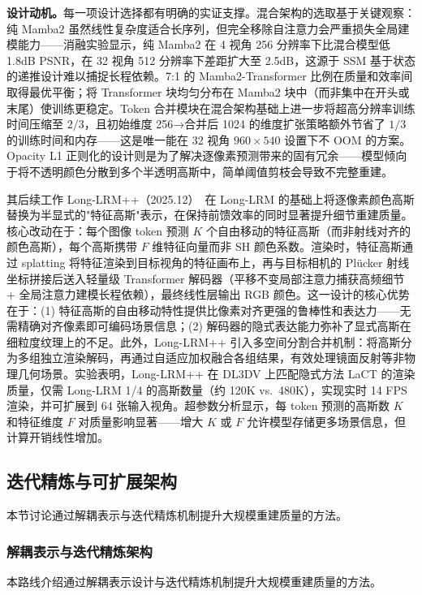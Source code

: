 \textbf{设计动机。}每一项设计选择都有明确的实证支撑。混合架构的选取基于关键观察：纯 Mamba2 虽然线性复杂度适合长序列，但完全移除自注意力会严重损失全局建模能力——消融实验显示，纯 Mamba2 在 4 视角 256 分辨率下比混合模型低 1.8dB PSNR，在 32 视角 512 分辨率下差距扩大至 2.5dB，这源于 SSM 基于状态的递推设计难以捕捉长程依赖。7:1 的 Mamba2-Transformer 比例在质量和效率间取得最优平衡；将 Transformer 块均匀分布在 Mamba2 块中（而非集中在开头或末尾）使训练更稳定。Token 合并模块在混合架构基础上进一步将超高分辨率训练时间压缩至 $2/3$，且初始维度 256→合并后 1024 的维度扩张策略额外节省了 $1/3$ 的训练时间和内存——这是唯一能在 32 视角 $960\times540$ 设置下不 OOM 的方案。Opacity L1 正则化的设计则是为了解决逐像素预测带来的固有冗余——模型倾向于将不透明颜色分散到多个半透明高斯中，简单阈值剪枝会导致不完整重建。

其后续工作 Long-LRM++（2025.12）~\cite{2512_10267}在 Long-LRM 的基础上将逐像素颜色高斯替换为半显式的"特征高斯"表示，在保持前馈效率的同时显著提升细节重建质量。核心改动在于：每个图像 token 预测 $K$ 个自由移动的特征高斯（而非射线对齐的颜色高斯），每个高斯携带 $F$ 维特征向量而非 SH 颜色系数。渲染时，特征高斯通过 splatting 将特征渲染到目标视角的特征画布上，再与目标相机的 Pl\"ucker 射线坐标拼接后送入轻量级 Transformer 解码器（平移不变局部注意力捕获高频细节 + 全局注意力建模长程依赖），最终线性层输出 RGB 颜色。这一设计的核心优势在于：(1) 特征高斯的自由移动特性提供比像素对齐更强的鲁棒性和表达力——无需精确对齐像素即可编码场景信息；(2) 解码器的隐式表达能力弥补了显式高斯在细粒度纹理上的不足。此外，Long-LRM++ 引入多空间分割合并机制：将高斯分为多组独立渲染解码，再通过自适应加权融合各组结果，有效处理镜面反射等非物理几何场景。实验表明，Long-LRM++ 在 DL3DV 上匹配隐式方法 LaCT 的渲染质量，仅需 Long-LRM 1/4 的高斯数量（约 120K vs.\ 480K），实现实时 14 FPS 渲染，并可扩展到 64 张输入视角。超参数分析显示，每 token 预测的高斯数 $K$ 和特征维度 $F$ 对质量影响显著——增大 $K$ 或 $F$ 允许模型存储更多场景信息，但计算开销线性增加。

\subsection{迭代精炼与可扩展架构}
\label{ss:13_4b}

本节讨论通过解耦表示与迭代精炼机制提升大规模重建质量的方法。

\subsubsection{解耦表示与迭代精炼架构}

本路线介绍通过解耦表示设计与迭代精炼机制提升大规模重建质量的方法。

